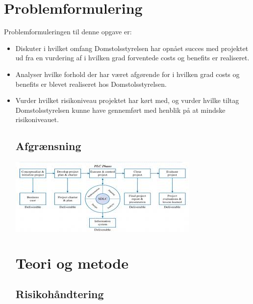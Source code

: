 \documentclass[10pt,a4paper,danish]{article}
\begin{document}
\section{Problemformulering}
Problemformuleringen til denne opgave er:
\begin{itemize}
\item Diskuter i hvilket omfang Domstolsstyrelsen har opnået succes med projektet ud fra en vurdering af i hvilken grad forventede costs og benefits er realiseret.
\item Analyser hvilke forhold der har været afgørende for i hvilken grad costs og benefits er blevet realiseret hos Domstolsstyrelsen.
\item Vurder hvilket risikoniveau projektet har kørt med, og vurder hvilke tiltag Domstolsstyrelsen kunne have gennemført med henblik på at mindske risikoniveauet.

\subsection{Afgrænsning}


\includegraphics{sdlc.jpg}

\section{Teori og metode}




\subsection{Risikohåndtering}


\end{itemize}
\end{document}
